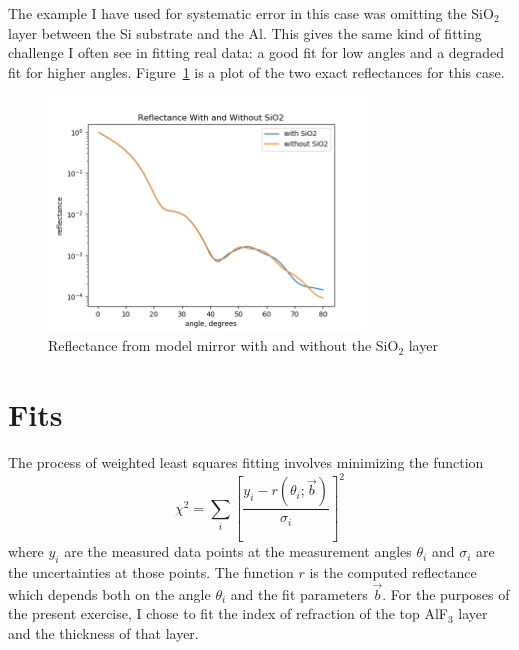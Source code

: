 \documentclass[english]{scrartcl}
\begin{document}
The example I have used for systematic error in this case was omitting the
SiO$_2$ layer between the Si substrate and the Al. This gives the same
kind of fitting challenge I often see in fitting real data: a good fit
for low angles and a degraded fit for higher angles.
Figure~\ref{fig:with-and-without} is a plot of the two exact reflectances
for this case.
\begin{figure}[htb]
	\begin{center}
		\includegraphics[width=0.75\textwidth]{images/with-and-without}
	\end{center}
	\caption{\label{fig:with-and-without}Reflectance from model mirror with and
		without the SiO$_2$ layer}
\end{figure}


\section{Fits}
The process of weighted least squares fitting involves minimizing
the function
\begin{equation}
\chi^2 = \sum_i\left[\frac{y_i - r(\theta_i;
	\vec{b})}{\sigma_i}\right]^2\label{eq:chisq}
\end{equation}
where $y_i$ are the measured data points at the measurement angles
$\theta_i$ and $\sigma_i$ are the uncertainties at those points. The
function $r$ is the computed reflectance which depends both on the angle
$\theta_i$ and the fit parameters $\vec{b}$. For the purposes of
the present exercise, I chose to fit the index of refraction of
the top AlF$_3$ layer and the thickness of that layer.
\end{document}
